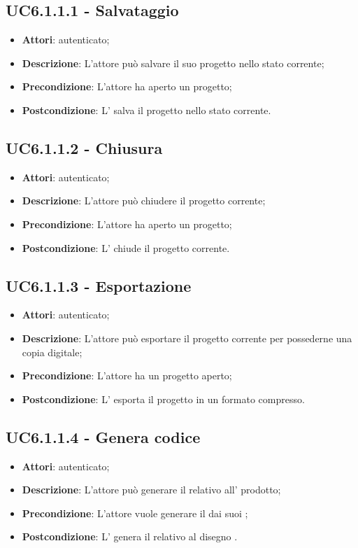 \subsection{UC6.1.1.1 - Salvataggio}
\label{ssec:UC6.1.1.1}
\begin{itemize}
\item \textbf{Attori}:  autenticato;
\item \textbf{Descrizione}: L’attore può salvare il suo progetto nello stato corrente;
\item \textbf{Precondizione}: L’attore ha aperto un progetto;
\item \textbf{Postcondizione}: L’ salva il progetto nello stato corrente.
\end{itemize}
\subsection{UC6.1.1.2 - Chiusura}
\label{ssec:UC6.1.1.2}
\begin{itemize}
\item \textbf{Attori}:  autenticato;
\item \textbf{Descrizione}: L’attore può chiudere il progetto corrente;
\item \textbf{Precondizione}: L'attore ha aperto un progetto;
\item \textbf{Postcondizione}: L’ chiude il progetto corrente.
\end{itemize}
\subsection{UC6.1.1.3 - Esportazione}
\label{ssec:UC6.1.1.3}
\begin{itemize}
\item \textbf{Attori}:  autenticato;
\item \textbf{Descrizione}: L’attore può esportare il progetto corrente per possederne una copia digitale;
\item \textbf{Precondizione}: L’attore ha un progetto aperto;
\item \textbf{Postcondizione}: L’ esporta il progetto in un formato compresso.
\end{itemize}
\subsection{UC6.1.1.4 - Genera codice}
\label{ssec:UC6.1.1.4}
\begin{itemize}
\item \textbf{Attori}:  autenticato;
\item \textbf{Descrizione}: L’attore può generare il  relativo all’ prodotto;
\item \textbf{Precondizione}: L’attore vuole generare il  dai suoi  ;
\item \textbf{Postcondizione}: L’ genera il  relativo al disegno .
\end{itemize}
